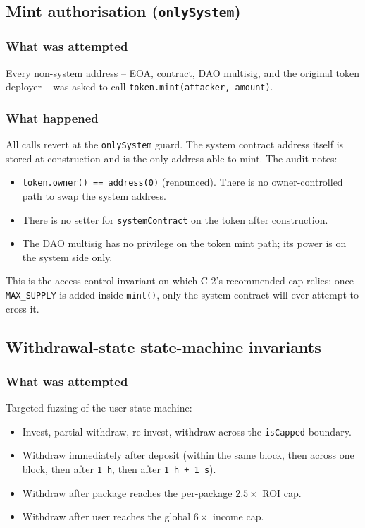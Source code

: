 \documentclass[11pt,a4paper]{article}
\begin{document}
\subsection{Mint authorisation (\texttt{onlySystem})}

\subsubsection*{What was attempted}

Every non-system address -- EOA, contract, DAO multisig, and the original
token deployer -- was asked to call \texttt{token.mint(attacker, amount)}.

\subsubsection*{What happened}

All calls revert at the \texttt{onlySystem} guard. The system contract
address itself is stored at construction and is the only address able to
mint. The audit notes:

\begin{itemize}[leftmargin=*]
    \item \texttt{token.owner() == address(0)} (renounced). There is no
          owner-controlled path to swap the system address.
    \item There is no setter for \texttt{systemContract} on the token after
          construction.
    \item The DAO multisig has no privilege on the token mint path; its
          power is on the system side only.
\end{itemize}

This is the access-control invariant on which C-2's recommended cap
relies: once \texttt{MAX\_SUPPLY} is added inside \texttt{mint()}, only the
system contract will ever attempt to cross it.

\subsection{Withdrawal-state state-machine invariants}

\subsubsection*{What was attempted}

Targeted fuzzing of the user state machine:

\begin{itemize}[leftmargin=*]
    \item Invest, partial-withdraw, re-invest, withdraw across the
          \texttt{isCapped} boundary.
    \item Withdraw immediately after deposit (within the same block, then
          across one block, then after \texttt{1 h}, then after
          \texttt{1 h + 1 s}).
    \item Withdraw after package reaches the per-package $2.5\times$ ROI
          cap.
    \item Withdraw after user reaches the global $6\times$ income cap.
\end{itemize}
\end{document}
